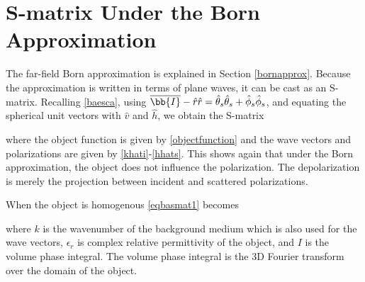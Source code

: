 {\footnotesize
{}
}


\section{S-matrix Under the Born Approximation}
\label{smatrixborn}

The far-field Born approximation is explained in Section \ref{bornapprox}. Because the approximation is written in terms of plane waves, it can be cast as an S-matrix.  Recalling \eqref{baesca}, using $\overline{\bb{I}}  - \hat{r}\hat{r} = \hat{\theta}_s\hat{\theta}_s + \hat{\phi}_s\hat{\phi}_s$, and equating the spherical unit vectors with $\hat{v}$ and $\hat{h}$, we obtain the S-matrix 


\noindent where the object function is given by \eqref{objectfunction} and the wave vectors and polarizations are given by \eqref{khati}-\eqref{hhats}. This shows again that under the Born approximation, the object does not influence the polarization. The depolarization is merely the projection between incident and scattered polarizations. 

When the object is homogenous \eqref{eqbasmat1} becomes 

\noindent where $k$ is the wavenumber of the background medium which is also used for the wave vectors, $\epsilon_r$ is complex relative permittivity of the object, and $I$ is the volume phase integral. The volume phase integral is the 3D Fourier transform over the domain of the object. 

\clearpage

